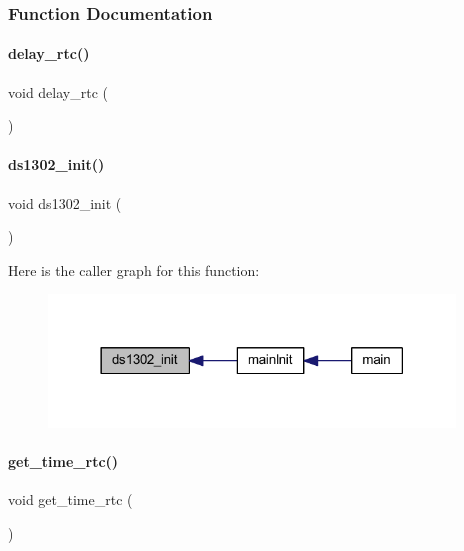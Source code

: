 \subsubsection{Function Documentation}
\mbox{\label{a00014_a30a11d605a2fcfe8fc79c4f0a17a20cf}} 
\paragraph{delay\+\_\+rtc()}
{\footnotesize\ttfamily void delay\+\_\+rtc (\begin{DoxyParamCaption}{ }\end{DoxyParamCaption})}

\mbox{\label{a00014_a0665eb059e742e4bb5a419144336e147}} 
\paragraph{ds1302\+\_\+init()}
{\footnotesize\ttfamily void ds1302\+\_\+init (\begin{DoxyParamCaption}{ }\end{DoxyParamCaption})}

Here is the caller graph for this function\+:
\nopagebreak
\begin{figure}[H]
\begin{center}
\leavevmode
\includegraphics[width=306pt]{a00014_a0665eb059e742e4bb5a419144336e147_icgraph}
\end{center}
\end{figure}
\mbox{\label{a00014_a628868f4036626e8fa1b055bf56dc2f1}} 
\paragraph{get\+\_\+time\+\_\+rtc()}
{\footnotesize\ttfamily void get\+\_\+time\+\_\+rtc (\begin{DoxyParamCaption}{ }\end{DoxyParamCaption})}

